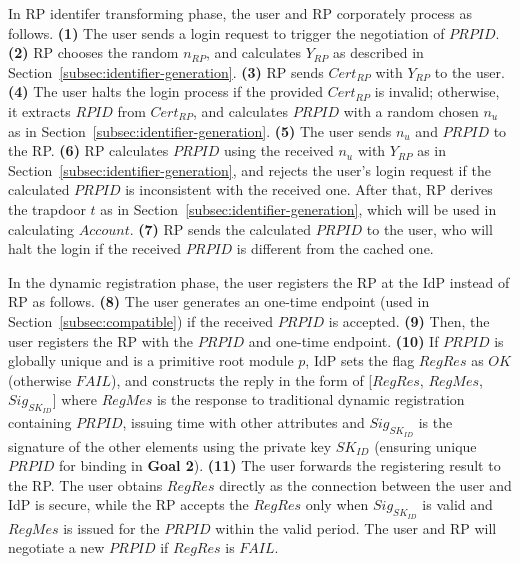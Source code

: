 In RP identifer transforming phase, the user and RP corporately process as follows. \textbf{(1)} The user sends a login request to trigger the negotiation of $PRPID$. \textbf{(2)} RP chooses the random $n_{RP}$, and calculates $Y_{RP}$ as described in Section~\ref{subsec:identifier-generation}. \textbf{(3)} RP sends $Cert_{RP}$ with $Y_{RP}$ to the user.  \textbf{(4)} The user halts the login process if the provided $Cert_{RP}$ is invalid; otherwise, it extracts $RPID$ from $Cert_{RP}$, and calculates $PRPID$ with a random chosen $n_u$ as in Section~\ref{subsec:identifier-generation}. \textbf{(5)} The user sends $n_u$ and $PRPID$ to the RP. \textbf{(6)} RP calculates $PRPID$ using the received $n_u$ with $Y_{RP}$ as in Section~\ref{subsec:identifier-generation}, and rejects the user's login request if the calculated $PRPID$ is inconsistent with the received one. After that, RP derives the trapdoor $t$ as in Section~\ref{subsec:identifier-generation}, which will be used in calculating $Account$. \textbf{(7)} RP sends the calculated $PRPID$ to the user, who will halt the login if the received $PRPID$ is different from the cached one.

In the dynamic registration phase, the user registers the RP at the IdP instead of RP as follows. \textbf{(8)} The user generates an one-time endpoint (used in Section~\ref{subsec:compatible}) if the received $PRPID$ is accepted. \textbf{(9)} Then, the user registers the RP with the $PRPID$ and one-time endpoint. \textbf{(10)} If $PRPID$ is globally unique and is a primitive root module $p$, IdP sets the flag $RegRes$ as $OK$ (otherwise $FAIL$), and constructs the reply in the form of
[$RegRes$, $RegMes$, $Sig_{SK_{ID}}$]
where $RegMes$ is the response to traditional dynamic registration containing $PRPID$, issuing time with other attributes and $Sig_{SK_{ID}}$ is the signature of the other elements using the private key $SK_{ID}$ (ensuring unique $PRPID$ for binding in \textbf{Goal 2}). \textbf{(11)} The user forwards the registering result to the RP. The user obtains $RegRes$ directly as the connection between the user and IdP is secure, while the RP accepts the $RegRes$ only when $Sig_{SK_{ID}}$ is valid
and $RegMes$ is issued for the $PRPID$ within the valid period. The user and RP will negotiate a new $PRPID$ if $RegRes$ is $FAIL$.

